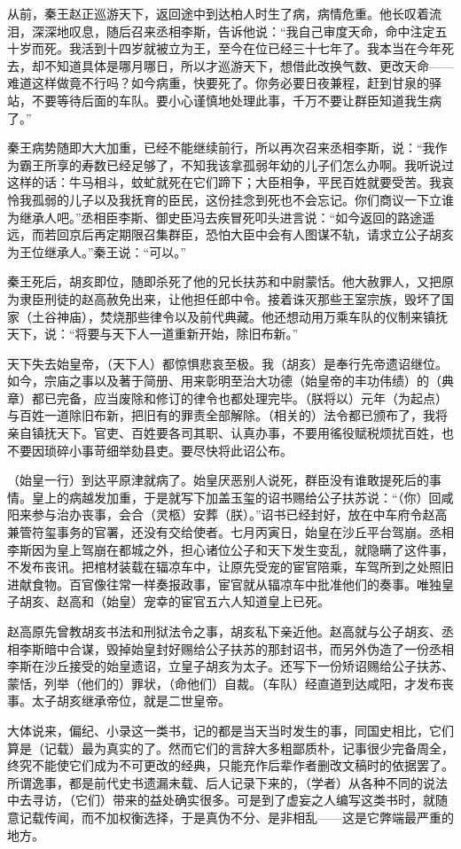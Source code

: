 \documentclass[11pt,a4paper]{ctexart}
\begin{document}
\begin{translation}
从前，秦王赵正巡游天下，返回途中到达柏人时生了病，病情危重。他长叹着流泪，深深地叹息，随后召来丞相李斯，告诉他说：“我自己审度天命，命中注定五十岁而死。我活到十四岁就被立为王，至今在位已经三十七年了。我本当在今年死去，却不知道具体是哪月哪日，所以才巡游天下，想借此改换气数、更改天命——难道这样做竟不行吗？如今病重，快要死了。你务必要日夜兼程，赶到甘泉的驿站，不要等待后面的车队。要小心谨慎地处理此事，千万不要让群臣知道我生病了。”

秦王病势随即大大加重，已经不能继续前行，所以再次召来丞相李斯，说：“我作为霸王所享的寿数已经足够了，不知我该拿孤弱年幼的儿子们怎么办啊。我听说过这样的话：牛马相斗，蚊虻就死在它们蹄下；大臣相争，平民百姓就要受苦。我哀怜我孤弱的儿子以及我抚育的臣民，这份挂念到死也不会忘记。你们商议一下立谁为继承人吧。”丞相臣李斯、御史臣冯去疾冒死叩头进言说：“如今返回的路途遥远，而若回京后再定期限召集群臣，恐怕大臣中会有人图谋不轨，请求立公子胡亥为王位继承人。”秦王说：“可以。”

秦王死后，胡亥即位，随即杀死了他的兄长扶苏和中尉蒙恬。他大赦罪人，又把原为隶臣刑徒的赵高赦免出来，让他担任郎中令。接着诛灭那些王室宗族，毁坏了国家（土谷神庙），焚烧那些律令以及前代典藏。他还想动用万乘车队的仪制来镇抚天下，说：“将要与天下人一道重新开始，除旧布新。”
\end{translation}

\begin{translation}
天下失去始皇帝，（天下人）都惊惧悲哀至极。我（胡亥）是奉行先帝遗诏继位。如今，宗庙之事以及著于简册、用来彰明至治大功德（始皇帝的丰功伟绩）的（典章）都已完备，应当废除和修订的律令也都处理完毕。（朕将以）元年（为起点）与百姓一道除旧布新，把旧有的罪责全部解除。（相关的）法令都已颁布了，我将亲自镇抚天下。官吏、百姓要各司其职、认真办事，不要用徭役赋税烦扰百姓，也不要因琐碎小事苛细举劾县吏。要尽快将此诏公布。
\end{translation}

\begin{translation}
（始皇一行）到达平原津就病了。始皇厌恶别人说死，群臣没有谁敢提死后的事情。皇上的病越发加重，于是就写下加盖玉玺的诏书赐给公子扶苏说：“（你）回咸阳来参与治办丧事，会合（灵柩）安葬（朕）。”诏书已经封好，放在中车府令赵高兼管符玺事务的官署，还没有交给使者。七月丙寅日，始皇在沙丘平台驾崩。丞相李斯因为皇上驾崩在都城之外，担心诸位公子和天下发生变乱，就隐瞒了这件事，不发布丧讯。把棺材装载在辐凉车中，让原先受宠的宦官陪乘，车驾所到之处照旧进献食物。百官像往常一样奏报政事，宦官就从辐凉车中批准他们的奏事。唯独皇子胡亥、赵高和（始皇）宠幸的宦官五六人知道皇上已死。

赵高原先曾教胡亥书法和刑狱法令之事，胡亥私下亲近他。赵高就与公子胡亥、丞相李斯暗中合谋，毁掉始皇封好赐给公子扶苏的那封诏书，而另外伪造了一份丞相李斯在沙丘接受的始皇遗诏，立皇子胡亥为太子。还写下一份矫诏赐给公子扶苏、蒙恬，列举（他们的）罪状，（命他们）自裁。（车队）经直道到达咸阳，才发布丧事。太子胡亥继承帝位，就是二世皇帝。
\end{translation}

\begin{translation}
大体说来，偏纪、小录这一类书，记的都是当天当时发生的事，同国史相比，它们算是（记载）最为真实的了。然而它们的言辞大多粗鄙质朴，记事很少完备周全，终究不能使它们成为不可更改的经典，只能充作后辈作者删改文稿时的依据罢了。所谓逸事，都是前代史书遗漏未载、后人记录下来的，（学者）从各种不同的说法中去寻访，（它们）带来的益处确实很多。可是到了虚妄之人编写这类书时，就随意记载传闻，而不加权衡选择，于是真伪不分、是非相乱——这是它弊端最严重的地方。
\end{translation}
\end{document}
